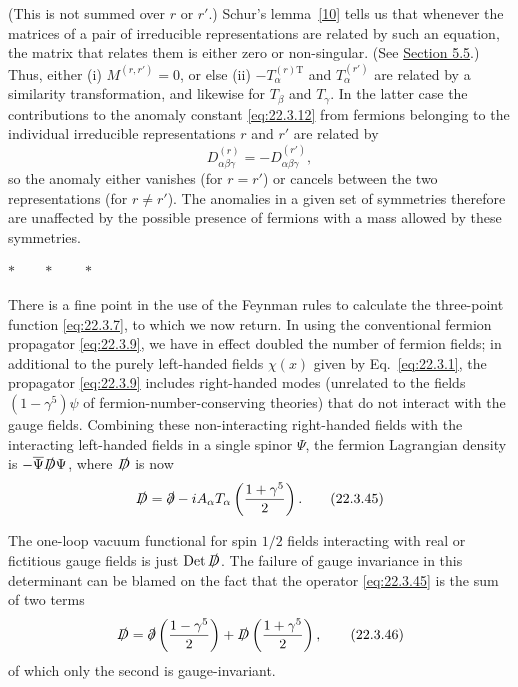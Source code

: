 (This is not summed over $r$ or $r'$.) Schur's
lemma~\hyperref[ch22-ref-10]{[10]} tells us that whenever the matrices of a
pair of irreducible representations are related by such an equation, the
matrix that relates them is either zero or non-singular. (See
\hyperref[sec:5.5]{Section 5.5}.) Thus, either (i) $M^{(r,r')}=0$, or else
(ii) $-T_\alpha^{(r)\mathrm T}$ and $T_\alpha^{(r')}$ are related by a
similarity transformation, and likewise for $T_\beta$ and $T_\gamma$. In
the latter case the contributions to the anomaly constant
\eqref{eq:22.3.12} from fermions belonging to the individual irreducible
representations $r$ and $r'$ are related by
\begin{equation}
 D_{\alpha\beta\gamma}^{(r)}
 =-D_{\alpha\beta\gamma}^{(r')},
 \tag{22.3.44}\label{eq:22.3.44}
\end{equation}
so the anomaly either vanishes (for $r=r'$) or cancels between the two
representations (for $r\ne r'$). The anomalies in a given set of
symmetries therefore are unaffected by the possible presence of fermions
with a mass allowed by these symmetries.

\begin{center}
 $\ast\qquad\ast\qquad\ast$
\end{center}

There is a fine point in the use of the Feynman rules to calculate the
three-point function \eqref{eq:22.3.7}, to which we now return. In using the
conventional fermion propagator \eqref{eq:22.3.9}, we have in effect
doubled the number of fermion fields; in additional to the purely
left-handed fields $\chi(x)$ given by Eq.~\eqref{eq:22.3.1}, the propagator
\eqref{eq:22.3.9} includes right-handed modes (unrelated to the fields
$(1-\gamma^5)\psi$ of fermion-number-conserving theories) that do not
interact with the gauge fields. Combining these non-interacting
right-handed fields with the interacting left-handed fields in a single
spinor $\Psi$, the fermion Lagrangian density is
$-\overline\Psi\sl{D}\Psi$, where $\sl{D}$ is now
\begin{equation}
 \sl{D}=\sl{\partial}
 -iA_\alpha T_\alpha\left(\frac{1+\gamma^5}{2}\right).
 \tag{22.3.45}\label{eq:22.3.45}
\end{equation}

The one-loop vacuum functional for spin $1/2$ fields interacting with real
or fictitious gauge fields is just $\operatorname{Det}\sl{D}$. The failure
of gauge invariance in this determinant can be blamed on the fact that the
operator \eqref{eq:22.3.45} is the sum of two terms
\begin{equation}
 \sl{D}
 =\sl{\partial}\left(\frac{1-\gamma^5}{2}\right)
 +\sl{D}\left(\frac{1+\gamma^5}{2}\right),
 \tag{22.3.46}\label{eq:22.3.46}
\end{equation}
of which only the second is gauge-invariant.

